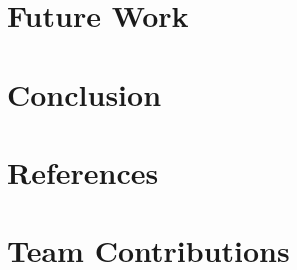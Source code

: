 \documentclass[newfonts=false,format=sigconf,10pt,letterpaper]{acmart}
\begin{document}
\section{Future Work}
\label{sec:future_work}


\section{Conclusion}
\label{sec:conclusion}


\section{References}
\label{sec:ref}


\section*{Team Contributions}
\label{sec:team}


% 
%
\end{document}
